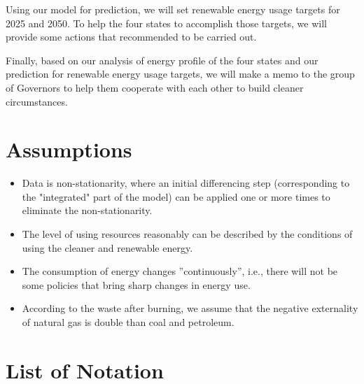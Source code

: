 \documentclass{mcmthesis}
\begin{document}
Using our model for prediction, we will set renewable energy usage targets for 2025 and 2050. To help the four states to accomplish those targets, we will provide some actions that recommended to be carried out.

Finally, based on our analysis of energy profile of the four states and our prediction for renewable energy usage targets, we will make a memo to the group of Governors to help them cooperate with each other to build cleaner circumstances. 

\section{Assumptions}

\begin{itemize}
\item Data is non-stationarity, where an initial differencing step (corresponding to the "integrated" part of the model) can be applied one or more times to eliminate the non-stationarity.
\item The level of using resources reasonably can be described by the conditions of using the cleaner and renewable energy.
 \item The consumption of energy changes ''continuously'', i.e., there will not be some policies that bring sharp changes in energy use.
 \item According to the waste after burning, we assume that the negative externality of natural gas is double than coal and petroleum.
\end{itemize}

\section{List of Notation}
\end{document}
